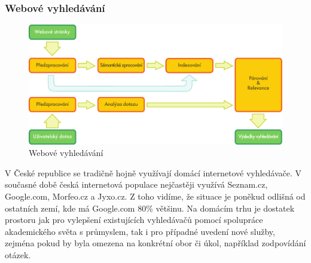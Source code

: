 \begin{multicols}{2}
\subsubsection{Webové vyhledávání}
\begin{figure}[htb]
  \center
  \includegraphics[width=\textwidth]{../_media/czech/web_search_architecture}
  \caption{Webové vyhledávání}
  \label{fig:websearcharch_cz}
 \end{figure}
V České republice se tradičně hojně využívají domácí internetové vyhledávače. V současné době česká internetová populace nejčastěji využívá Seznam.cz, Google.com, Morfeo.cz a Jyxo.cz. Z toho vidíme, že situace je poněkud odlišná od ostatních zemí, kde má Google.com 80\% většinu. Na domácím trhu je dostatek prostoru jak pro vylepšení existujících vyhledávačů pomocí spolupráce akademického světa s průmyslem, tak i pro případné uvedení nové služby, zejména pokud by byla omezena na konkrétní obor či úkol, například zodpovídání otázek.


\end{multicols}
